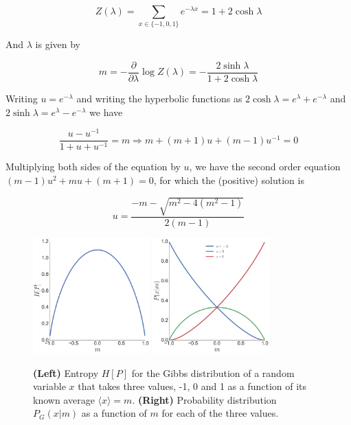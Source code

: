 \begin{equation}
   Z(\lambda) = \sum_{x\in \{-1, 0, 1\}} e^{-\lambda x} =
   1 + 2\cosh \lambda
\end{equation}

And $\lambda$ is given by

\begin{equation}
   m = - \frac{\partial}{\partial \lambda} \log Z(\lambda) =  - \frac{2 \sinh \lambda}{1 + 2 \cosh \lambda}
\end{equation}

Writing $u = e^{-\lambda}$ and writing the hyperbolic functions as $2 \cosh \lambda = e^\lambda + e^{-\lambda}$ and $2 \sinh \lambda = e^\lambda - e^{-\lambda}$ we have

\begin{equation}
   \frac{u - u^{-1}}{1 + u + u^{-1}} = m \Rightarrow 
   m + (m+1)u + (m -1) u^{-1} = 0
\end{equation}

Multiplying both sides of the equation by $u$, we have the second order equation $(m - 1) u^2 + m u + (m + 1) = 0$, for which the (positive) solution is

\begin{equation}
   u = \frac{-m - \sqrt{m^2 - 4(m^2 - 1)}}{2 (m - 1)}
\end{equation}

\begin{figure}[!ht]
  \centering
  \includegraphics[width=0.4\textwidth]{figs_statmech/fig1a.png}
  \includegraphics[width=0.4\textwidth]{figs_statmech/fig1b.png}
  \caption{\textbf{(Left)} Entropy $H[P]$ for the Gibbs distribution of a random variable $x$ that takes three values, -1, 0 and 1 as a function of its known average $\langle x \rangle = m$. \textbf{(Right)} Probability distribution $P_G(x|m)$ as a function of $m$ for each of the three values.}
  \label{fig:simple_example}
\end{figure}

